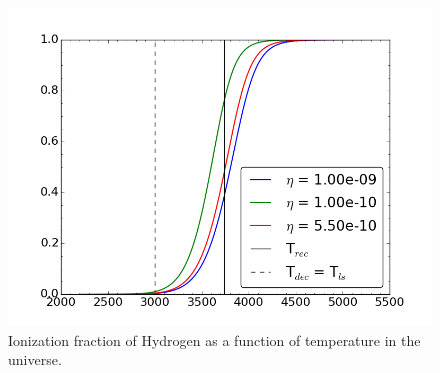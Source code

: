 \documentclass[12pt]{article}%
\begin{document}
\begin{figure}[t]
\center
\includegraphics[width=0.9\linewidth]{x_T}
\caption{Ionization fraction of Hydrogen as a function of temperature in the universe.}
\label{fig:p4}
\end{figure}
\end{document}
